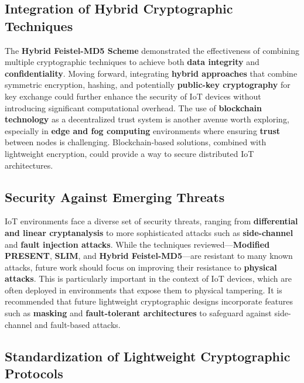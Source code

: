 \documentclass{article}
\begin{document}
\subsection{Integration of Hybrid Cryptographic Techniques}

The \textbf{Hybrid Feistel-MD5 Scheme} demonstrated the effectiveness of combining multiple cryptographic techniques to achieve both \textbf{data integrity} and \textbf{confidentiality}. Moving forward, integrating \textbf{hybrid approaches} that combine symmetric encryption, hashing, and potentially \textbf{public-key cryptography} for key exchange could further enhance the security of IoT devices without introducing significant computational overhead. The use of \textbf{blockchain technology} as a decentralized trust system is another avenue worth exploring, especially in \textbf{edge and fog computing} environments where ensuring \textbf{trust} between nodes is challenging. Blockchain-based solutions, combined with lightweight encryption, could provide a way to secure distributed IoT architectures.

\subsection{Security Against Emerging Threats}

IoT environments face a diverse set of security threats, ranging from \textbf{differential and linear cryptanalysis} to more sophisticated attacks such as \textbf{side-channel} and \textbf{fault injection attacks}. While the techniques reviewed—\textbf{Modified PRESENT}, \textbf{SLIM}, and \textbf{Hybrid Feistel-MD5}—are resistant to many known attacks, future work should focus on improving their resistance to \textbf{physical attacks}. This is particularly important in the context of IoT devices, which are often deployed in environments that expose them to physical tampering. It is recommended that future lightweight cryptographic designs incorporate features such as \textbf{masking} and \textbf{fault-tolerant architectures} to safeguard against side-channel and fault-based attacks.

\subsection{Standardization of Lightweight Cryptographic Protocols}
\end{document}
